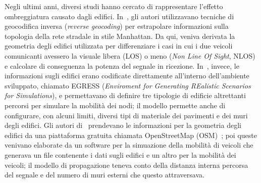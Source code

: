 Negli ultimi anni, diversi studi hanno cercato di rappresentare l'effetto ombreggiatura causato dagli edifici.
In~\cite{Giordano:2010:CST:1860058.1860065}, gli autori utilizzavano tecniche di geocodifica inversa (\textit{reverse geocoding}) per estrapolare
informazioni sulla topologia della rete stradale in stile Manhattan. Da qui, veniva derivata la geometria degli edifici utilizzata
per differenziare i casi in cui i due veicoli comunicanti avessero la visuale libera (LOS) o meno (\textit{Non Line Of Sight}, NLOS)
e calcolare di conseguenza la potenza del segnale in ricezione.
In~\cite{4020783}, invece, le informazioni sugli edifici erano codificate direttamente all'interno dell'ambiente sviluppato, chiamato
EGRESS (\textit{Enviroment for Generating REalistic Scenarios for Simulations}), e permettavano di definire tre tipologie di edificie altrettanti
percorsi per simulare la mobilità dei nodi; il modello permette anche di configurare, con alcuni limiti, diversi tipi di materiale dei pavimenti e dei muri degli edifici.
Gli autori di~\cite{Carpenter:2015:OMI:2756509.2756512} prendevano le informazioni per la geometria degli edifici da una piattaforma gratuita
chiamata OpenStreetMap (OSM)~\cite{osmWebsite}; poi queste venivano elaborate da un software per la simuazione della mobilità di veicoli
che generava un file contenente i dati sugli edifici e un altro per la mobilità dei veicoli;
il modello di propagazione teneva conto della distanza interna percorsa del segnale e del numero di muri esterni che questo attraversava.
